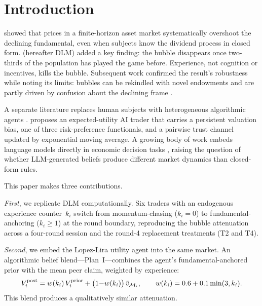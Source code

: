 \section{Introduction}
\label{sec:intro}

\citet{smith1988bubbles} showed that prices in a finite-horizon asset
market systematically overshoot the declining fundamental, even when
subjects know the dividend process in closed form.
\citet{dufwenberg2005bubbles} (hereafter DLM) added a key finding:
the bubble disappears once two-thirds of the population has played the
game before.  Experience, not cognition or incentives, kills the
bubble.  Subsequent work confirmed the result's robustness
\citep{haruvy2007traders} while noting its limits: bubbles can be
rekindled with novel endowments \citep{hussam2008thar} and are partly
driven by confusion about the declining frame
\citep{kirchler2012thar}.

A separate literature replaces human subjects with heterogeneous
algorithmic agents
\citep{lebaron2006agentbased,hommes2006heterogeneous}.
\citet{lopezlira2025llm} proposes an expected-utility AI trader that
carries a persistent valuation bias, one of three risk-preference
functionals, and a pairwise trust channel updated by exponential
moving average.  A growing body of work embeds language models
directly in economic decision tasks
\citep{brown2023gpt,aher2023using,chen2023emergence,park2023generative},
raising the question of whether LLM-generated beliefs produce
different market dynamics than closed-form rules.

This paper makes three contributions.

\emph{First}, we replicate DLM computationally.  Six traders with an
endogenous experience counter~$k_i$ switch from momentum-chasing
($k_i{=}0$) to fundamental-anchoring ($k_i{\ge}1$) at the round
boundary, reproducing the bubble attenuation across a four-round
session and the round-4 replacement treatments (T2 and T4).

\emph{Second}, we embed the Lopez-Lira utility agent into the same
market.  An algorithmic belief blend---Plan~I---combines the agent's
fundamental-anchored prior with the mean peer claim, weighted by
experience:
\begin{equation}
V_i^{\text{post}} = w(k_i)\,V_i^{\text{prior}}
+ \bigl(1{-}w(k_i)\bigr)\,\bar{v}_{\mathcal{M}_i},
\qquad
w(k_i) = 0.6 + 0.1\min(3,k_i).
\label{eq:plan1}
\end{equation}
This blend produces a qualitatively similar attenuation.


